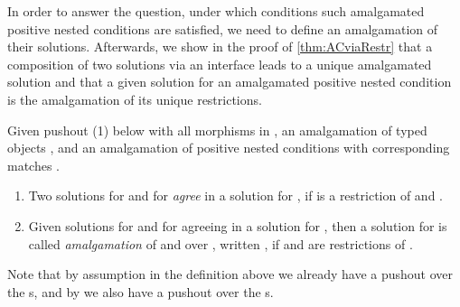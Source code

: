 In order to answer the question, under which conditions such amalgamated positive nested conditions are satisfied, we need to define an amalgamation of their solutions. Afterwards, we show in the proof of \autoref{thm:ACviaRestr} that a composition of two solutions via an interface leads to a unique amalgamated solution and that a given solution for an amalgamated positive nested condition is the amalgamation of its unique restrictions.

\begin{definition}\label{def:agreement-amalgamation-solution}
	Given pushout (1) below with all morphisms in \M, an amalgamation of typed objects ,
	and an amalgamation of positive nested conditions  
	with corresponding matches .
	\begin{enumerate}
		\item Two solutions  for  and  for  \emph{agree} in a solution  for ,
			if  is a restriction of  and .
		
		\item Given solutions  for  and  for  agreeing in a solution  for , 
			then a solution  for  is called \emph{amalgamation} of
			 and  over , written , if  and  are restrictions of .
	\end{enumerate}

\end{definition}

\begin{remark}\label{rem:agreement-amalgamation-solution}
	Note that by assumption  in the definition above we already have a pushout over the s, and by 
	 we also have a pushout over the s. 
\end{remark}

